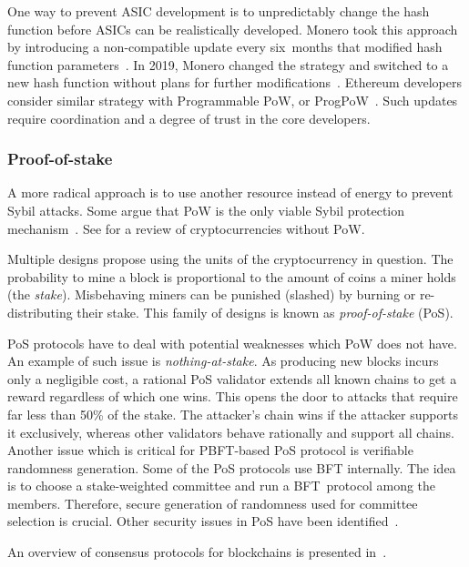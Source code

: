 One way to prevent ASIC development is to unpredictably change the hash function before ASICs can be realistically developed.
Monero took this approach by introducing a non-compatible update every six~months that modified hash function parameters~\cite{Kim2019}.
In 2019, Monero changed the strategy and switched to a new hash function without plans for further modifications~\cite{dEBRUYNE2019}.
Ethereum developers consider similar strategy with Programmable PoW, or ProgPoW~\cite{OLeary2019}.
Such updates require coordination and a degree of trust in the core developers.


\subsubsection*{Proof-of-stake}

A more radical approach is to use another resource instead of energy to prevent Sybil attacks.
Some argue that PoW is the only viable Sybil protection mechanism~\cite{Andreev2014, Sztorc2015}.
See \cite{Bentov2016} for a review of cryptocurrencies without PoW.

Multiple designs propose using the units of the cryptocurrency in question.
The probability to mine a block is proportional to the amount of coins a miner holds (the \textit{stake}).
Misbehaving miners can be punished (slashed) by burning or re-distributing their stake.
This family of designs is known as \textit{proof-of-stake} (PoS).

PoS protocols have to deal with potential weaknesses which PoW does not have.
An example of such issue is \textit{nothing-at-stake}.
As producing new blocks incurs only a negligible cost, a rational PoS validator extends all known chains to get a reward regardless of which one wins.
This opens the door to attacks that require far less than 50\% of the stake.
The attacker's chain wins if the attacker supports it exclusively, whereas other validators behave rationally and support all chains.
Another issue which is critical for PBFT-based PoS protocol is verifiable randomness generation.
Some of the PoS protocols use BFT internally.
The idea is to choose a stake-weighted committee and run a BFT~protocol among the members.
Therefore, secure generation of randomness used for committee selection is crucial.
Other security issues in PoS have been identified~\cite{Fanti2019,Gazi2018,BrownCohen2019,Chitra2020}.

An overview of consensus protocols for blockchains is presented in~\cite{Bano2019}.


